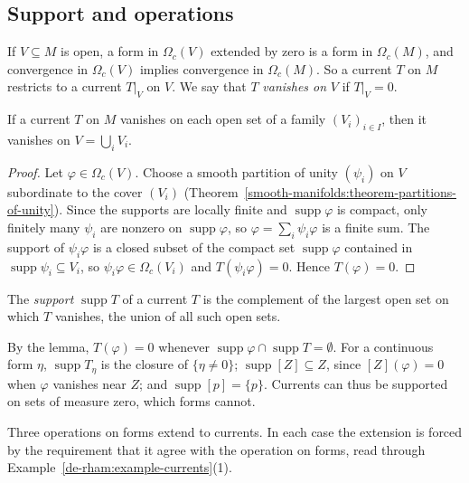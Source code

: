 \subsection{Support and operations}\label{de-rham:subsection-currents-operations}

If $V \subseteq M$ is open, a form in $\Omega_c(V)$ extended by zero is a form in $\Omega_c(M)$, and convergence in $\Omega_c(V)$ implies convergence in $\Omega_c(M)$. So a current $T$ on $M$
restricts to a current $T|_V$ on $V$. We say that $T$ \emph{vanishes on} $V$ if $T|_V = 0$.

\begin{lemma}\label{de-rham:lemma-currents-local}
If a current $T$ on $M$ vanishes on each open set of a family $(V_i)_{i \in I}$, then it vanishes on $V = \bigcup_iV_i$.
\end{lemma}

\begin{proof}
Let $\varphi \in \Omega_c(V)$. Choose a smooth partition of unity $(\psi_i)$ on $V$ subordinate to the cover $(V_i)$ (Theorem~\ref{smooth-manifolds:theorem-partitions-of-unity}). Since the supports are
locally finite and $\operatorname{supp}\varphi$ is compact, only finitely many $\psi_i$ are nonzero on $\operatorname{supp}\varphi$, so $\varphi = \sum_i\psi_i\varphi$ is a finite sum. The support of
$\psi_i\varphi$ is a closed subset of the compact set $\operatorname{supp}\varphi$ contained in $\operatorname{supp}\psi_i \subseteq V_i$, so $\psi_i\varphi \in \Omega_c(V_i)$ and $T(\psi_i\varphi) = 0$. Hence
$T(\varphi) = 0$.
\end{proof}

\begin{definition}\label{de-rham:definition-current-support}
The \emph{support} $\operatorname{supp}T$ of a current $T$ is the complement of the largest open set on which $T$ vanishes, the union of all such open sets.
\end{definition}

By the lemma, $T(\varphi) = 0$ whenever $\operatorname{supp}\varphi \cap \operatorname{supp}T = \emptyset$. For a continuous form $\eta$, $\operatorname{supp}T_\eta$ is the closure of
$\{\eta \neq 0\}$; $\operatorname{supp}[Z] \subseteq Z$, since $[Z](\varphi) = 0$ when $\varphi$ vanishes near $Z$; and $\operatorname{supp}[p] = \{p\}$. Currents can thus be supported on
sets of measure zero, which forms cannot.

Three operations on forms extend to currents. In each case the extension is forced by the requirement that it agree with the operation on forms, read through
Example~\ref{de-rham:example-currents}(1).

